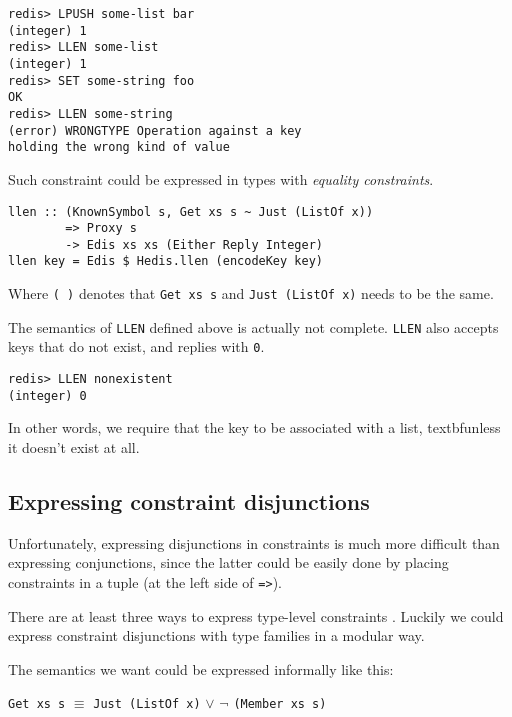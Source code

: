 \documentclass[pldi]{sigplanconf-pldi16}
\begin{document}
\begin{verbatim}
redis> LPUSH some-list bar
(integer) 1
redis> LLEN some-list
(integer) 1
redis> SET some-string foo
OK
redis> LLEN some-string
(error) WRONGTYPE Operation against a key
holding the wrong kind of value
\end{verbatim}

Such constraint could be expressed in types with
\emph{equality constraints}\cite{typeeq}.

\begin{verbatim}
llen :: (KnownSymbol s, Get xs s ~ Just (ListOf x))
        => Proxy s
        -> Edis xs xs (Either Reply Integer)
llen key = Edis $ Hedis.llen (encodeKey key)
\end{verbatim}

Where \texttt{(~)} denotes that \texttt{Get xs s}
and \texttt{Just (ListOf x)} needs to be the same.

The semantics of \texttt{LLEN} defined above is actually not
complete. \texttt{LLEN} also accepts keys that do not exist, and
 replies with \texttt{0}.

\begin{verbatim}
redis> LLEN nonexistent
(integer) 0
\end{verbatim}

In other words, we require that the key to be associated with a list,
 textbf{unless} it doesn't exist at all.

\subsection{Expressing constraint disjunctions}

Unfortunately, expressing disjunctions in constraints is much more difficult
 than expressing conjunctions, since the latter could be easily done by placing
 constraints in a tuple (at the left side of \texttt{=>}).

There are at least three ways to express type-level constraints
\cite{singletons}. Luckily we could express constraint disjunctions with type
 families in a modular way.

The semantics we want could be expressed informally like this:

\texttt{Get xs s} $\equiv$ \texttt{Just (ListOf x)}
$\vee$ $\neg$ \texttt{(Member xs s)}
\end{document}

